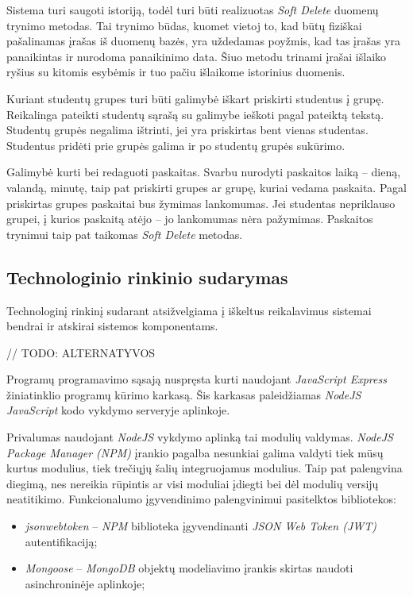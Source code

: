 \documentclass{VUMIFPSbakalaurinis}
\begin{document}
Sistema turi saugoti istoriją, todėl turi būti realizuotas \textit{Soft Delete} duomenų trynimo metodas. Tai trynimo būdas, kuomet vietoj to, kad būtų fiziškai pašalinamas įrašas iš duomenų bazės, yra uždedamas poyžmis, kad tas įrašas yra panaikintas ir nurodoma panaikinimo data. Šiuo metodu trinami įrašai išlaiko ryšius su kitomis esybėmis ir tuo pačiu išlaikome istorinius duomenis.


Kuriant studentų grupes turi būti galimybė iškart priskirti studentus į grupę. Reikalinga pateikti studentų sąrašą su galimybe ieškoti pagal pateiktą tekstą. Studentų grupės negalima ištrinti, jei yra priskirtas bent vienas studentas. Studentus pridėti prie grupės galima ir po studentų grupės sukūrimo.


Galimybė kurti bei redaguoti paskaitas. Svarbu nurodyti paskaitos laiką – dieną, valandą, minutę, taip pat priskirti grupes ar grupę, kuriai vedama paskaita. Pagal priskirtas grupes paskaitai bus žymimas lankomumas. Jei studentas nepriklauso grupei, į kurios paskaitą atėjo – jo lankomumas nėra pažymimas. Paskaitos trynimui taip pat taikomas \textit{Soft Delete} metodas.

\subsection{Technologinio rinkinio sudarymas}

Technologinį rinkinį sudarant atsižvelgiama į iškeltus reikalavimus sistemai bendrai ir atskirai sistemos komponentams.

// TODO: ALTERNATYVOS

Programų programavimo sąsają nuspręsta kurti naudojant \textit{JavaScript Express} žiniatinklio programų kūrimo karkasą. Šis karkasas paleidžiamas \textit{NodeJS} \textit{JavaScript} kodo vykdymo serveryje aplinkoje.

Privalumas naudojant \textit{NodeJS} vykdymo aplinką tai modulių valdymas. \textit{NodeJS Package Manager (NPM)} įrankio pagalba nesunkiai galima valdyti tiek mūsų kurtus modulius, tiek trečiųjų šalių integruojamus modulius. Taip pat palengvina diegimą, nes nereikia rūpintis ar visi moduliai įdiegti bei dėl modulių versijų neatitikimo. Funkcionalumo įgyvendinimo palengvinimui pasitelktos bibliotekos:

\begin{itemize}
    \item \textit{jsonwebtoken} – \textit{NPM} biblioteka įgyvendinanti \textit{JSON Web Token (JWT)} autentifikaciją;
    \item \textit{Mongoose} – \textit{MongoDB} objektų modeliavimo įrankis skirtas naudoti asinchroninėje aplinkoje;
\end{itemize}
\end{document}
